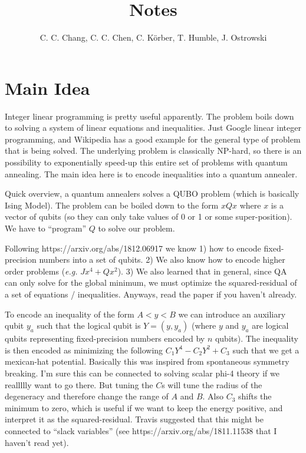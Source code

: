 \documentclass[]{article}
\author{C. C. Chang, C. C. Chen, C. K\"orber, T. Humble, J. Ostrowski}
\title{Notes}
\begin{document}
\maketitle

\section{Main Idea}

Integer linear programming is pretty useful apparently. The problem boils down to solving a system of linear equations and inequalities. Just Google linear integer programming, and Wikipedia has a good example for the general type of problem that is being solved. The underlying problem is classically NP-hard, so there is an possibility to exponentially speed-up this entire set of problems with quantum annealing. The main idea here is to encode inequalities into a quantum annealer.

Quick overview, a quantum annealers solves a QUBO problem (which is basically Ising Model). The problem can be boiled down to the form $x Q x$ where $x$ is a vector of qubits (so they can only take values of 0 or 1 or some super-position). We have to ``program'' $Q$ to solve our problem.

Following https://arxiv.org/abs/1812.06917 we know 1) how to encode fixed-precision numbers into a set of qubits. 2) We also know how to encode higher order problems (\textit{e.g.} $J x^4 + Q x^2$). 3)  We also learned that in general, since QA can only solve for the global minimum, we must optimize the squared-residual of a set of equations / inequalities. Anyways, read the paper if you haven't already.

To encode an inequality of the form $A < y < B$ we can introduce an auxiliary qubit $y_a$ such that the logical qubit is $Y = (y, y_a)$ (where $y$ and $y_a$ are logical qubits representing fixed-precision numbers encoded by $n$ qubits). The inequality is then encoded as minimizing the following $C_1 Y^4 - C_2 Y^2 + C_3$ such that we get a mexican-hat potential. Basically this was inspired from spontaneous symmetry breaking. I'm sure this can be connected to solving scalar phi-4 theory if we reallllly want to go there. But tuning the $C$s will tune the radius of the degeneracy and therefore change the range of $A$ and $B$.  Also $C_3$ shifts the minimum to zero, which is useful if we want to keep the energy positive, and interpret it as the squared-residual. Travis suggested that this might be connected to ``slack variables'' (see https://arxiv.org/abs/1811.11538 that I haven't read yet).
\end{document}

